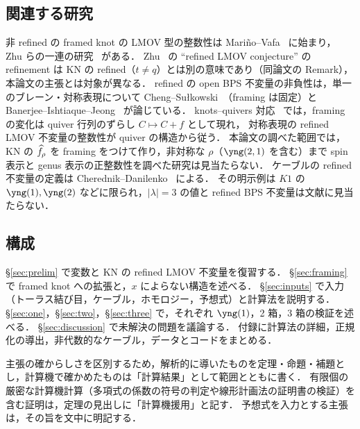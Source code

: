 \subsection{関連する研究}
非 refined の framed knot の LMOV 型の整数性は Mariño--Vafa~\cite{Marino01} に始まり，
Zhu らの一連の研究~\cite{Zhu21,Luo16,Luo21,Wang25,Zhu25} がある．
Zhu~\cite{Zhu21} の ``refined LMOV conjecture'' の refinement は KN の refined（$t\neq q$）とは別の意味であり（同論文の Remark），本論文の主張とは対象が異なる．
refined の open BPS 不変量の非負性は，単一のブレーン・対称表現について Cheng--Sułkowski~\cite{Cheng21}（framing は固定）と
Banerjee--Ishtiaque--Jeong~\cite{Banerjee26} が論じている．
knots--quivers 対応~\cite{Kucharski17,Kucharski17b,Ekholm18} では，framing の変化は quiver 行列のずらし $C\mapsto C+f$ として現れ，
対称表現の refined LMOV 不変量の整数性が quiver の構造から従う．
本論文の調べた範囲では，KN の $\widehat{f}_\rho$ を framing をつけて作り，非対称な $\rho$（$\yng(2,1)$ を含む）まで spin 表示と genus 表示の正整数性を調べた研究は見当たらない．
ケーブルの refined 不変量の定義は Cherednik--Danilenko~\cite{Cherednik14,Cherednik15} による．
その明示例は $K1$ の $\yng(1),\yng(2)$ などに限られ，$|\lambda|=3$ の値と refined BPS 不変量は文献に見当たらない．

\subsection{構成}
\S\ref{sec:prelim} で変数と KN の refined LMOV 不変量を復習する．
\S\ref{sec:framing} で framed knot への拡張と，$x$ によらない構造を述べる．
\S\ref{sec:inputs} で入力（トーラス結び目，ケーブル，ホモロジー，予想式）と計算法を説明する．
\S\ref{sec:one}，\S\ref{sec:two}，\S\ref{sec:three} で，それぞれ $\yng(1)$，2 箱，3 箱の検証を述べる．
\S\ref{sec:discussion} で未解決の問題を議論する．
付録に計算法の詳細，正規化の導出，非代数的なケーブル，データとコードをまとめる．

主張の確からしさを区別するため，解析的に導いたものを定理・命題・補題とし，計算機で確かめたものは「計算結果」として範囲とともに書く．
有限個の厳密な計算機計算（多項式の係数の符号の判定や線形計画法の証明書の検証）を含む証明は，定理の見出しに「計算機援用」と記す．
予想式を入力とする主張は，その旨を文中に明記する．
